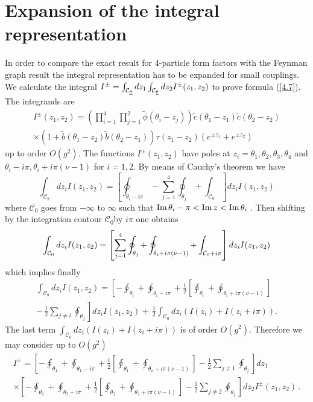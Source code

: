\documentclass[a4paper,a4paper]{article}
\begin{document}
\section{Expansion of the integral representation}

\label{a3}In order to compare the exact result for 4-particle form factors
with the Feynman graph result the integral representation has to be expanded
for small couplings. We calculate the integral $I^{\pm }=\int_{\mathcal{C}_{%
\underline{\theta }}}dz_{1}\int_{\mathcal{C}_{\underline{\theta }%
}}dz_{2}I^{\pm }(z_{1},z_{2})$ to prove formula (\ref{4.7}). The integrands
are 
\begin{multline*}
I^{\pm }(z_{1},z_{2})=\left( \prod_{i=1}^{4}\prod_{j=1}^{2}\tilde{\phi}%
(\theta _{i}-z_{j})\right) \tilde{c}(\theta _{1}-z_{1})\tilde{c}(\theta
_{2}-z_{2}) \\
\times \left( 1+\tilde{b}(\theta _{1}-z_{2})\tilde{b}(\theta
_{2}-z_{1})\right) \tau (z_{1}-z_{2})\left( e^{\pm z_{1}}+e^{\pm
z_{2}}\right)
\end{multline*}
up to order $O(g^{2})$. The functions $I^{\pm }(z_{1},z_{2})$ have poles at $%
z_{i}=\theta _{1},\theta _{2},\theta _{3},\theta _{4}$ and $\theta _{i}-i\pi
,\theta _{i}+i\pi (\nu -1)$ for $i=1,2$. By means of Cauchy's theorem we
have 
\[
\int_{\mathcal{C}_{\underline{\theta }}}dz_{i}I(z_{1},z_{2})=\left[
\oint_{\theta _{i}-i\pi }-\sum_{j=1}^{4}\oint_{\theta _{j}}+\int_{\mathcal{C}%
_{0}}\right] dz_{i}I(z_{1},z_{2}) 
\]
where $\mathcal{C}_{0}$ goes from $-\infty $ to $\infty $ such that $%
\mathop{\rm Im}\theta _{i}-\pi <\mathop{\rm Im}z<\mathop{\rm Im}\theta _{i}$%
. Then shifting by the integration contour $\mathcal{C}_{0}$by $i\pi $ one
obtains 
\[
\int_{\mathcal{C}_{0}}dz_{i}I(z_{1},z_{2})=\left[
\sum_{j=1}^{4}\oint_{\theta _{j}}+\oint_{\theta _{i}+i\pi (\nu -1)}+\int_{%
\mathcal{C}_{0}+i\pi }\right] dz_{i}I(z_{1},z_{2}) 
\]
which implies finally 
\begin{multline*}
\int_{\mathcal{C}_{\underline{\theta }}}dz_{i}I(z_{1},z_{2})=\left[
-\oint_{\theta _{i}}+\oint_{\theta _{i}-i\pi }+\tfrac{1}{2}\left[
\oint_{\theta _{i}}+\oint_{\theta _{i}+i\pi (\nu -1)}\right] \right. \\
\left. -\,\tfrac{1}{2}\sum_{j\neq i}\oint_{\theta _{j}}\right]
dz_{i}I(z_{1},z_{2})+\,\tfrac{1}{2}\int_{\mathcal{C}_{0}}dz_{i}\left(
I(z_{i})+I(z_{i}+i\pi )\right) .
\end{multline*}
The last term $\int_{\mathcal{C}_{0}}dz_{i}\left( I(z_{i})+I(z_{i}+i\pi
)\right) $ is of order $O(g^{2})$. Therefore we may consider up to $O(g^{2})$%
\begin{multline*}
I^{\pm }=\left[ -\oint_{\theta _{1}}+\oint_{\theta _{1}-i\pi }+\tfrac{1}{2}%
\left[ \oint_{\theta _{1}}+\oint_{\theta _{1}+i\pi (\nu -1)}\right] -\tfrac{1%
}{2}\sum_{j\neq 1}\oint_{\theta _{j}}\right] dz_{1} \\
\times \left[ -\oint_{\theta _{2}}+\oint_{\theta _{2}-i\pi }+\tfrac{1}{2}%
\left[ \oint_{\theta _{2}}+\oint_{\theta _{2}+i\pi (\nu -1)}\right] -\tfrac{1%
}{2}\sum_{j\neq 2}\oint_{\theta _{j}}\right] dz_{2}I^{\pm }(z_{1},z_{2})\,.
\end{multline*}
\end{document}
